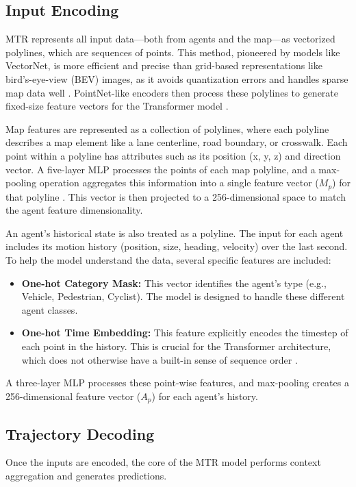 \subsection{Input Encoding}
\label{sec:model_input_encoding}
MTR represents all input data—both from agents and the map—as vectorized polylines, which are sequences of points. This method, pioneered by models like VectorNet, is more efficient and precise than grid-based representations like bird's-eye-view (BEV) images, as it avoids quantization errors and handles sparse map data well \cite{gao2020vectornet}. PointNet-like encoders then process these polylines to generate fixed-size feature vectors for the Transformer model \cite{PointNet2017}.

Map features are represented as a collection of polylines, where each polyline describes a map element like a lane centerline, road boundary, or crosswalk. Each point within a polyline has attributes such as its position (x, y, z) and direction vector. A five-layer MLP processes the points of each map polyline, and a max-pooling operation aggregates this information into a single feature vector ($M_p$) for that polyline \cite{Shi2022MTR}. This vector is then projected to a 256-dimensional space to match the agent feature dimensionality.

An agent's historical state is also treated as a polyline. The input for each agent includes its motion history (position, size, heading, velocity) over the last second. To help the model understand the data, several specific features are included:
\begin{itemize}
    \item \textbf{One-hot Category Mask:} This vector identifies the agent's type (e.g., Vehicle, Pedestrian, Cyclist). The model is designed to handle these different agent classes.
    \item \textbf{One-hot Time Embedding:} This feature explicitly encodes the timestep of each point in the history. This is crucial for the Transformer architecture, which does not otherwise have a built-in sense of sequence order \cite{Vaswani2017Attention}.
\end{itemize}
A three-layer MLP processes these point-wise features, and max-pooling creates a 256-dimensional feature vector ($A_p$) for each agent's history.

\subsection{Trajectory Decoding}
\label{sec:model_decoding}
Once the inputs are encoded, the core of the MTR model performs context aggregation and generates predictions.

